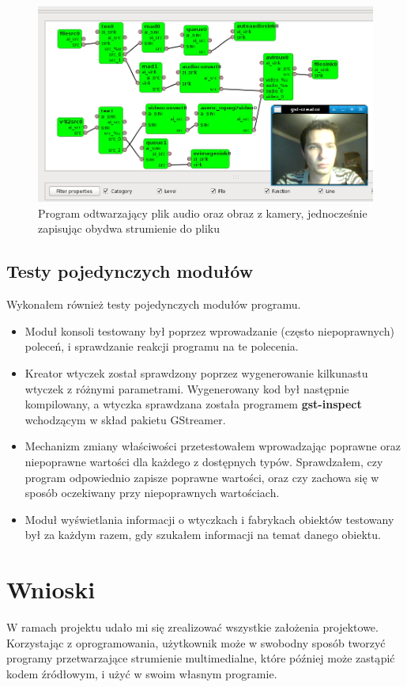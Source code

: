 \documentclass[12pt]{article}
\begin{document}
\begin{figure}[H]
  \includegraphics[width=160mm]{img/main-test-screen2.png}
  \caption{Program odtwarzający plik audio oraz obraz z kamery, jednocześnie zapisując obydwa strumienie do pliku}
  \label{fig:mainTestScreen2}
\end{figure}


\subsection{Testy pojedynczych modułów}
Wykonałem również testy pojedynczych modułów programu.
\begin{itemize}
  \setlength{\itemsep}{0em}
\item Moduł konsoli testowany był poprzez wprowadzanie (często niepoprawnych) poleceń, i sprawdzanie reakcji programu na te polecenia.
\item Kreator wtyczek został sprawdzony poprzez wygenerowanie kilkunastu wtyczek z różnymi parametrami. Wygenerowany kod był następnie kompilowany, a wtyczka sprawdzana została programem \textbf{gst-inspect} wchodzącym w skład pakietu GStreamer.
\item Mechanizm zmiany właściwości przetestowałem wprowadzając poprawne oraz niepoprawne wartości dla każdego z dostępnych typów. Sprawdzałem, czy program odpowiednio zapisze poprawne wartości, oraz czy zachowa się w sposób oczekiwany przy niepoprawnych wartościach.
\item Moduł wyświetlania informacji o wtyczkach i fabrykach obiektów testowany był za każdym razem, gdy szukałem informacji na temat danego obiektu.
\end{itemize}
\cleardoublepage
\section{Wnioski}
W ramach projektu udało mi się zrealizować wszystkie założenia projektowe. Korzystając z oprogramowania, użytkownik może w swobodny sposób tworzyć programy przetwarzające strumienie multimedialne, które później może zastąpić kodem źródłowym, i użyć w swoim własnym programie. 
\end{document}
